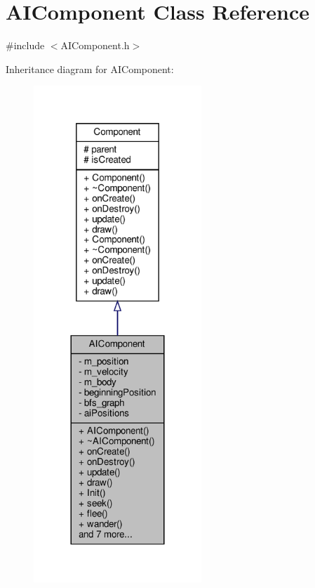\hypertarget{classAIComponent}{}\section{A\+I\+Component Class Reference}
\label{classAIComponent}


{\ttfamily \#include $<$A\+I\+Component.\+h$>$}



Inheritance diagram for A\+I\+Component\+:
\nopagebreak
\begin{figure}[H]
\begin{center}
\leavevmode
\includegraphics[width=179pt]{classAIComponent__inherit__graph}
\end{center}
\end{figure}



